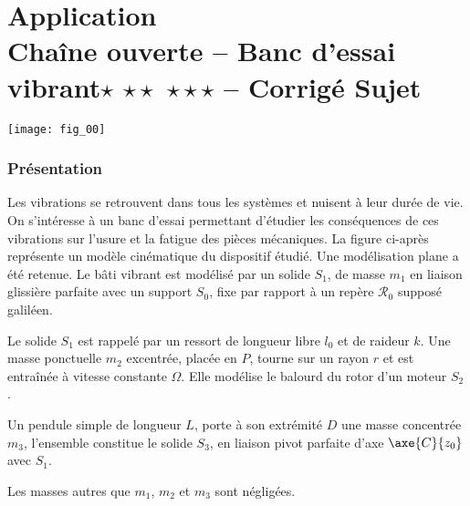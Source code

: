 \chapter*{Application  \\ 
Chaîne ouverte -- Banc d'essai vibrant\ifnormal $\star$ \else \fi \ifdifficile $\star\star$ \else \fi \iftdifficile $\star\star\star$ \else \fi
-- \ifprof Corrigé \else Sujet \fi}

\iflivret {} \else
\ifprof  {} \else \fi
\fi

\setcounter{question}{0}
\begin{marginfigure}
\texttt{[image: fig\_00]}
\end{marginfigure}


\subsection*{Présentation}
Les vibrations se retrouvent dans tous les systèmes et nuisent à leur durée de vie. On s’intéresse à un banc d’essai permettant d’étudier les conséquences de ces vibrations sur l’usure et la fatigue des pièces mécaniques.
La figure ci-après représente un modèle cinématique du dispositif étudié. Une modélisation plane a été retenue.
Le bâti vibrant est modélisé par un solide $S_1$, de masse $m_1$ en liaison glissière parfaite avec un support $S_0$, fixe par rapport à un repère $\mathcal{R}_0$ supposé galiléen.

Le solide $S_1$ est rappelé par un ressort de longueur libre $l_0$ et de raideur $k$.
Une masse ponctuelle $m_2$ excentrée, placée en $P$, tourne sur un rayon $r$ et est entraînée à vitesse constante $\Omega$. Elle modélise le 
balourd du rotor d’un moteur $S_2$.

Un pendule simple de longueur $L$, porte à son extrémité $D$ une masse concentrée $m_3$, l’ensemble constitue le solide $S_3$, en liaison pivot parfaite d’axe $\axe{C}{z_0}$ avec $S_1$.

Les masses autres que $m_1$, $m_2$ et $m_3$ sont négligées.



